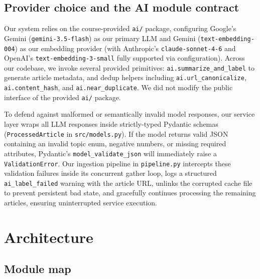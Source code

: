 \documentclass[11pt,a4paper]{article}
\begin{document}
\subsection{Provider choice and the AI module contract}

Our system relies on the course-provided \texttt{ai/} package, configuring Google's Gemini (\texttt{gemini-3.5-flash}) as our primary LLM and Gemini (\texttt{text-embedding-004}) as our embedding provider (with Anthropic's \texttt{claude-sonnet-4-6} and OpenAI's \texttt{text-embedding-3-small} fully supported via configuration). Across our codebase, we invoke several provided primitives: \texttt{ai.summarize\_and\_label} to generate article metadata, and dedup helpers including \texttt{ai.url\_canonicalize}, \texttt{ai.content\_hash}, and \texttt{ai.near\_duplicate}. We did not modify the public interface of the provided \texttt{ai/} package.

To defend against malformed or semantically invalid model responses, our service layer wraps all LLM responses inside strictly-typed Pydantic schemas (\texttt{ProcessedArticle} in \texttt{src/models.py}). If the model returns valid JSON containing an invalid topic enum, negative numbers, or missing required attributes, Pydantic's \texttt{model\_validate\_json} will immediately raise a \texttt{ValidationError}. Our ingestion pipeline in \texttt{pipeline.py} intercepts these validation failures inside its concurrent gather loop, logs a structured \texttt{ai\_label\_failed} warning with the article URL, unlinks the corrupted cache file to prevent persistent bad state, and gracefully continues processing the remaining articles, ensuring uninterrupted service execution.

\section{Architecture}\label{sec:arch}

\subsection{Module map}
\end{document}
